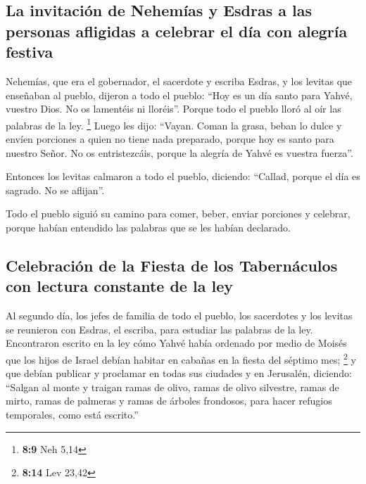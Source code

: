 \hypertarget{la-invitaciuxf3n-de-nehemuxedas-y-esdras-a-las-personas-afligidas-a-celebrar-el-duxeda-con-alegruxeda-festiva}{%
\subsection{La invitación de Nehemías y Esdras a las personas afligidas
a celebrar el día con alegría
festiva}\label{la-invitaciuxf3n-de-nehemuxedas-y-esdras-a-las-personas-afligidas-a-celebrar-el-duxeda-con-alegruxeda-festiva}}

 Nehemías, que era el gobernador, el sacerdote y escriba
Esdras, y los levitas que enseñaban al pueblo, dijeron a todo el pueblo:
``Hoy es un día santo para Yahvé, vuestro Dios. No os lamentéis ni
lloréis''. Porque todo el pueblo lloró al oír las palabras de la ley.
\footnote{\textbf{8:9} Neh 5,14}  Luego les dijo:
``Vayan. Coman la grasa, beban lo dulce y envíen porciones a quien no
tiene nada preparado, porque hoy es santo para nuestro Señor. No os
entristezcáis, porque la alegría de Yahvé es vuestra fuerza''.

 Entonces los levitas calmaron a todo el pueblo,
diciendo: ``Callad, porque el día es sagrado. No se aflijan''.

 Todo el pueblo siguió su camino para comer, beber,
enviar porciones y celebrar, porque habían entendido las palabras que se
les habían declarado.

\hypertarget{celebraciuxf3n-de-la-fiesta-de-los-tabernuxe1culos-con-lectura-constante-de-la-ley}{%
\subsection{Celebración de la Fiesta de los Tabernáculos con lectura
constante de la
ley}\label{celebraciuxf3n-de-la-fiesta-de-los-tabernuxe1culos-con-lectura-constante-de-la-ley}}

 Al segundo día, los jefes de familia de todo el pueblo,
los sacerdotes y los levitas se reunieron con Esdras, el escriba, para
estudiar las palabras de la ley.  Encontraron escrito en
la ley cómo Yahvé había ordenado por medio de Moisés que los hijos de
Israel debían habitar en cabañas en la fiesta del séptimo mes;
\footnote{\textbf{8:14} Lev 23,42}  y que debían publicar
y proclamar en todas sus ciudades y en Jerusalén, diciendo: ``Salgan al
monte y traigan ramas de olivo, ramas de olivo silvestre, ramas de
mirto, ramas de palmeras y ramas de árboles frondosos, para hacer
refugios temporales, como está escrito.''

